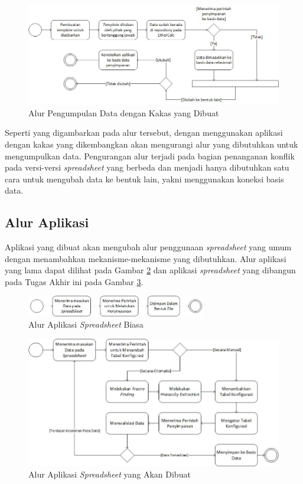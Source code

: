 \begin{figure}[htb]
    \centering
    \includegraphics[width=1\textwidth]{resources/chapter-3-workflow-kerja.jpg}
    \caption{Alur Pengumpulan Data dengan Kakas yang Dibuat}
	\label{GambarWorkflowKerja}
\end{figure}

Seperti yang digambarkan pada alur tersebut, dengan menggunakan aplikasi dengan kakas yang dikembangkan akan mengurangi alur yang dibutuhkan untuk mengumpulkan data. Pengurangan alur terjadi pada bagian penanganan konflik pada versi-versi \textit{spreadsheet} yang berbeda dan menjadi hanya dibutuhkan satu cara untuk mengubah data ke bentuk lain, yakni menggunakan koneksi basis data.

\subsection{Alur Aplikasi}
Aplikasi yang dibuat akan mengubah alur penggunaan \textit{spreadsheet} yang umum dengan menambahkan mekanisme-mekanisme yang dibutuhkan. Alur aplikasi yang lama dapat dilihat pada Gambar \ref{GambarWorkflowBiasa} dan aplikasi \textit{spreadsheet} yang dibangun pada Tugas Akhir ini pada Gambar \ref{GambarWorkflow}.

\begin{figure}[htb]
    \centering
    \includegraphics[width=0.7\textwidth]{resources/chapter-3-workflow-biasa.jpg}
    \caption{Alur Aplikasi \textit{Spreadsheet} Biasa}
	\label{GambarWorkflowBiasa}
\end{figure}

\begin{figure}[htb]
    \centering
    \includegraphics[width=1\textwidth]{resources/chapter-3-workflow.jpg}
    \caption{Alur Aplikasi \textit{Spreadsheet} yang Akan Dibuat}
	\label{GambarWorkflow}
\end{figure}

